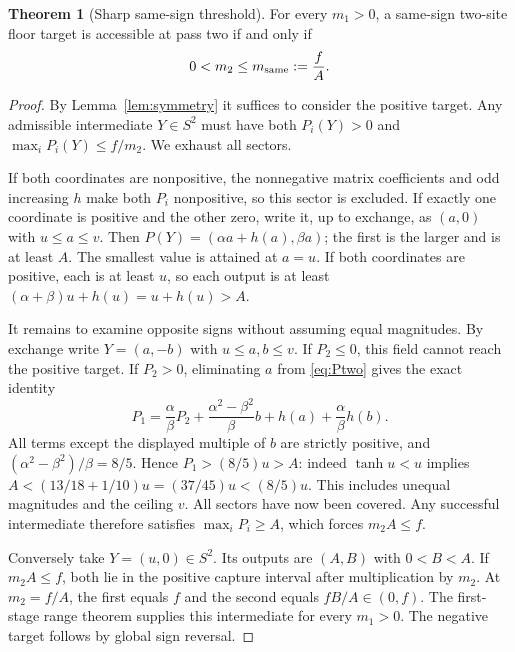 \documentclass[11pt,a4paper]{article}
\theoremstyle{definition}
\newtheorem{theorem}{Theorem}[section]
\theoremstyle{remark}\newtheorem{remark}[theorem]{Remark}
\numberwithin{equation}{section}
\begin{document}
\begin{theorem}[Sharp same-sign threshold]\label{thm:same}
For every $m_1>0$, a same-sign two-site floor target is accessible at pass two
if and only if
\begin{equation}\label{eq:msame}
 0<m_2\leq m_{\rm same}:=\frac fA.
\end{equation}
\end{theorem}
\begin{proof}
By Lemma~\ref{lem:symmetry} it suffices to consider the positive target.
Any admissible intermediate $Y\in S^2$ must have both $P_i(Y)>0$ and
$\max_iP_i(Y)\leq f/m_2$. We exhaust all sectors.

If both coordinates are nonpositive, the nonnegative matrix coefficients and
odd increasing $h$ make both $P_i$ nonpositive, so this sector is excluded.
If exactly one coordinate is positive and the other zero, write it, up to
exchange, as $(a,0)$ with $u\leq a\leq v$. Then
$P(Y)=(\alpha a+h(a),\beta a)$; the first is the larger and is at least $A$.
The smallest value is attained at $a=u$.
If both coordinates are positive, each is at least $u$, so each output is at least
$(\alpha+\beta)u+h(u)=u+h(u)>A$.

It remains to examine opposite signs without assuming equal magnitudes.
By exchange write $Y=(a,-b)$ with $u\leq a,b\leq v$.
If $P_2\leq0$, this field cannot reach the positive target.
If $P_2>0$, eliminating $a$ from \eqref{eq:Ptwo} gives the exact identity
\begin{equation}\label{eq:eliminate}
 P_1=\frac{\alpha}{\beta}P_2+
       \frac{\alpha^2-\beta^2}{\beta}b+
       h(a)+\frac{\alpha}{\beta}h(b).
\end{equation}
All terms except the displayed multiple of $b$ are strictly positive, and
$(\alpha^2-\beta^2)/\beta=8/5$. Hence
$P_1>(8/5)u>A$: indeed $\tanh u<u$ implies
$A<(13/18+1/10)u=(37/45)u<(8/5)u$.
This includes unequal magnitudes and the ceiling $v$. All sectors have now
been covered. Any successful intermediate therefore satisfies $\max_iP_i\geq A$,
which forces $m_2A\leq f$.

Conversely take $Y=(u,0)\in S^2$. Its outputs are $(A,B)$ with $0<B<A$.
If $m_2A\leq f$, both lie in the positive capture interval after multiplication
by $m_2$. At $m_2=f/A$, the first equals $f$ and the second equals $fB/A\in(0,f)$.
The first-stage range theorem supplies this intermediate for every $m_1>0$.
The negative target follows by global sign reversal.
\end{proof}
\end{document}
